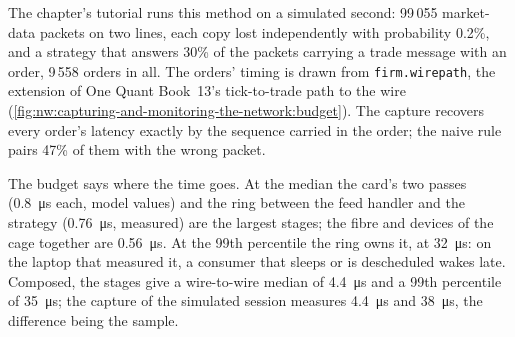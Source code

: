 The chapter's tutorial runs this method on a simulated second: 99\,055 market-data packets on two lines, each copy lost independently
with probability 0.2\%, and a strategy that answers 30\% of the packets carrying a trade message with an order, 9\,558 orders in all. The
orders' timing is drawn from \texttt{firm.wirepath}, the extension of One Quant Book~13's tick-to-trade path to the wire
(\cref{fig:nw:capturing-and-monitoring-the-network:budget}). The capture recovers every order's latency exactly by the sequence carried
in the order; the naive rule pairs 47\% of them with the wrong packet.

\begin{omfigure}

\label{fig:nw:capturing-and-monitoring-the-network:budget}
\end{omfigure}

The budget says where the time goes. At the median the card's two passes (\qty{0.8}{\micro\second} each, model values) and the ring
between the feed handler and the strategy (\qty{0.76}{\micro\second}, measured) are the largest stages; the fibre and devices of the cage
together are \qty{0.56}{\micro\second}. At the 99th percentile the ring owns it, at \qty{32}{\micro\second}: on the laptop that measured it,
a consumer that sleeps or is descheduled wakes late. Composed, the stages give a wire-to-wire median of \qty{4.4}{\micro\second} and a 99th
percentile of \qty{35}{\micro\second}; the capture of the simulated session measures \qty{4.4}{\micro\second} and \qty{38}{\micro\second}, the
difference being the sample.

